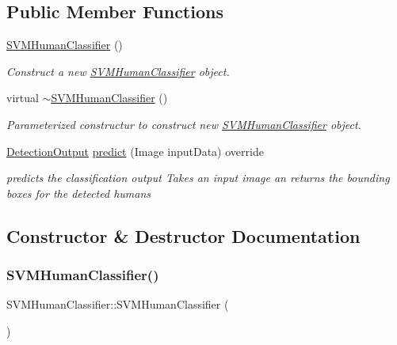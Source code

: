 \subsection*{Public Member Functions}
\begin{DoxyCompactItemize}
\item 
\hyperlink{classSVMHumanClassifier_ab99099674465b0ffa8c79feeb9b9b66a}{S\+V\+M\+Human\+Classifier} ()
\begin{DoxyCompactList}\small\item\em Construct a new \hyperlink{classSVMHumanClassifier}{S\+V\+M\+Human\+Classifier} object. \end{DoxyCompactList}\item 
virtual \hyperlink{classSVMHumanClassifier_a875ce0f61e85c8254f008b29f2c3a9b9}{$\sim$\+S\+V\+M\+Human\+Classifier} ()
\begin{DoxyCompactList}\small\item\em Parameterized constructur to construct new \hyperlink{classSVMHumanClassifier}{S\+V\+M\+Human\+Classifier} object. \end{DoxyCompactList}\item 
\hyperlink{classData}{Detection\+Output} \hyperlink{classSVMHumanClassifier_a14a416a22355b1426d7611082dfa2464}{predict} (Image input\+Data) override
\begin{DoxyCompactList}\small\item\em predicts the classification output Takes an input image an returns the bounding boxes for the detected humans \end{DoxyCompactList}\end{DoxyCompactItemize}


\subsection{Constructor \& Destructor Documentation}
\mbox{\label{classSVMHumanClassifier_ab99099674465b0ffa8c79feeb9b9b66a}} 
\subsubsection{\texorpdfstring{S\+V\+M\+Human\+Classifier()}{SVMHumanClassifier()}}
{\footnotesize\ttfamily S\+V\+M\+Human\+Classifier\+::\+S\+V\+M\+Human\+Classifier (\begin{DoxyParamCaption}{ }\end{DoxyParamCaption})}



